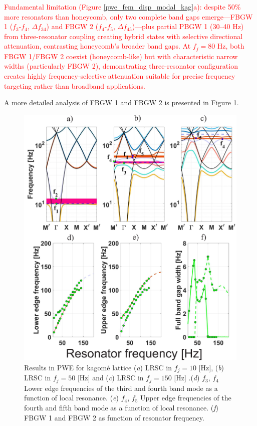 \documentclass[review,numbers,sort&compress]{elsarticle}
\begin{document}
\textcolor{red}{Fundamental limitation (Figure \ref{pwe_fem_disp_modal_kag}a): despite 50\% more resonators than honeycomb, only two complete band gaps emerge---FBGW 1 (\( f_3 \)-\( f_4 \), \( \Delta f_{34} \)) and FBGW 2 (\( f_4 \)-\( f_5 \), \( \Delta f_{45} \))---plus partial PBGW 1 (30--40 Hz) from three-resonator coupling creating hybrid states with selective directional attenuation, contrasting honeycomb's broader band gaps. At \( f_j = 80 \) Hz, both FBGW 1/FBGW 2 coexist (honeycomb-like) but with characteristic narrow widths (particularly FBGW 2), demonstrating three-resonator configuration creates highly frequency-selective attenuation suitable for precise frequency targeting rather than broadband applications.}

A more detailed analysis of FBGW 1 and FBGW 2 is presented in Figure \ref{pwe_disp_kag_all_res}.

\begin{figure}[htb]
	\centering
	\includegraphics[width=.8\textwidth]{2_5_disp_frf_kag.pdf}
	\caption{Results in PWE for kagomé lattice (\textit{a}) LRSC in $f_j=10$ [Hz], (\textit{b}) LRSC in $f_j=50$ [Hz] and (\textit{c}) LRSC in $f_j=150$ [Hz] .(\textit{d}) $f_3$, $f_4$ Lower edge frequencies of the third and fourth band mode as a function of local resonance. (\textit{e}) $f_4$, $f_5$ Upper edge frequencies of the fourth and fifth band mode as a function of local resonance. (\textit{f}) FBGW 1 and FBGW 2 as function of resonator frequency. }
	\label{pwe_disp_kag_all_res}
\end{figure}
\end{document}
